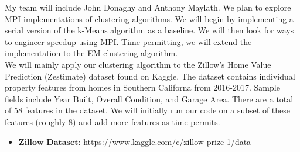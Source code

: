 \documentclass[12pt]{article}
\begin{document}
My team will include John Donaghy and Anthony Maylath. We plan to explore MPI implementations of clustering algorithms. We will begin by implementing a serial version of the k-Means algorithm as a baseline. We will then look for ways to engineer speedup using MPI. Time permitting, we will extend the implementation to the EM clustering algorithm.\\
 
We will mainly apply our clustering algorithm to the Zillow’s Home Value Prediction (Zestimate) dataset found on Kaggle. The dataset contains individual property features from homes in Southern Californa from 2016-2017. Sample fields include Year Built, Overall Condition, and Garage Area. There are a total of 58 features in the dataset. We will initially run our code on a subset of these features (roughly 8) and add more features as time permits.\\

\begin{itemize}
  \item $\textbf{Zillow Dataset:}$ \url{https://www.kaggle.com/c/zillow-prize-1/data}
\end{itemize}
\end{document}
